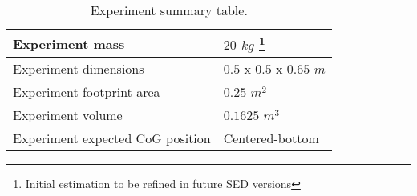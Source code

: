\begin{table}[!ht]
\centering
\begin{tabular}{|l|l|}
\hline
 Experiment mass  & $20$ $kg$ \footnote[13]{Initial estimation to be refined in future SED versions} \\ \hline
 Experiment dimensions & $0.5$ x $0.5$ x $0.65$ $m$ \\ \hline
 Experiment footprint area & $0.25$ $m^2$ \\ \hline
 Experiment volume  & $0.1625$ $m^3$ \\ \hline
 Experiment expected CoG position &  Centered-bottom \\ \hline
\end{tabular}
\caption{Experiment summary table.}
\label{dimensions_mass}
\end{table}
\raggedbottom